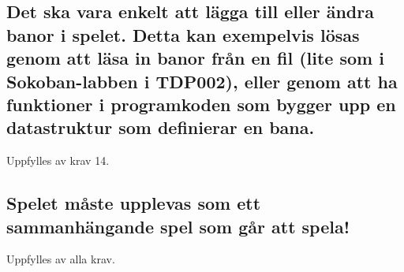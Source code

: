 \documentclass{TDP005mall}
\begin{document}
\subsection{Det ska vara enkelt att lägga till eller ändra banor i spelet. Detta kan exempelvis lösas genom att läsa in banor från en fil (lite som i Sokoban-labben i TDP002), eller genom att ha funktioner i programkoden som bygger upp en datastruktur som definierar en bana.}
Uppfylles av krav 14.
\subsection{Spelet måste upplevas som ett sammanhängande spel som går att spela!}
Uppfylles av alla krav.
\end{document}

